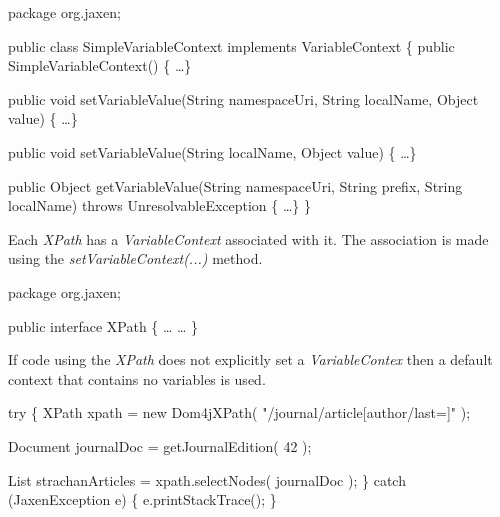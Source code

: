\documentclass[20pt,landscape,headrule,footrule]{foils}
\begin{document}
\begin{codelisting}
package org.jaxen;

public class SimpleVariableContext
    implements VariableContext
\{
    public SimpleVariableContext() \{ \dots \}

    public void setVariableValue(String namespaceUri,
                                 String localName,
                                 Object value) \{ \dots \}

    public void setVariableValue(String localName,
                                 Object value) \{ \dots \}

    public Object getVariableValue(String namespaceUri,
                                   String prefix,
                                   String localName)
        throws UnresolvableException \{ \dots \}
\}
\end{codelisting}



Each \emph{XPath} has a \emph{VariableContext} associated with
it.  The association is made using the \emph{setVariableContext(...)}
method.

\begin{codelisting}
package org.jaxen;

public interface XPath
\{
    \dots
    \dots
\}
\end{codelisting}

If code using the \emph{XPath} does not explicitly set a 
\emph{VariableContex} then
a default context that contains no variables is used.



\begin{codelisting}
try
\{
    XPath xpath = new Dom4jXPath( "/journal/article[author/last=]" );


    Document journalDoc = getJournalEdition( 42 );

    List strachanArticles = xpath.selectNodes( journalDoc );
\}
catch (JaxenException e)
\{
    e.printStackTrace();
\}
\end{codelisting}
\end{document}

